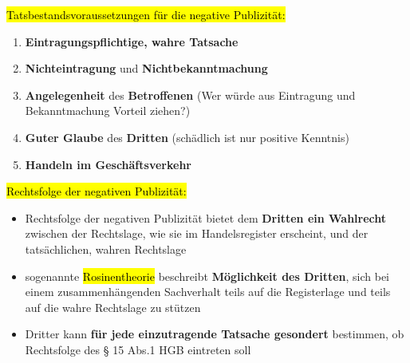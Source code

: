\documentclass[a4paper, 10pt]{article}
\begin{document}
\noindent\hl{Tatsbestandsvoraussetzungen für die negative Publizität:}
\begin{enumerate}
    \item \textbf{Eintragungspflichtige, wahre Tatsache}
    \item \textbf{Nichteintragung} und \textbf{Nichtbekanntmachung}
    \item \textbf{Angelegenheit} des \textbf{Betroffenen} (Wer würde aus Eintragung und Bekanntmachung Vorteil ziehen?)
    \item \textbf{Guter Glaube} des \textbf{Dritten} (schädlich ist nur positive Kenntnis)
    \item \textbf{Handeln im Geschäftsverkehr}
\end{enumerate}

\noindent\hl{Rechtsfolge der negativen Publizität:}
\begin{itemize}
    \item Rechtsfolge der negativen Publizität bietet dem \textbf{Dritten ein Wahlrecht} zwischen der Rechtslage, wie sie im Handelsregister erscheint, und der tatsächlichen, wahren Rechtslage 
    \item sogenannte \hl{Rosinentheorie} beschreibt \textbf{Möglichkeit des Dritten}, sich bei einem zusammenhängenden Sachverhalt teils auf die Registerlage und teils auf die wahre Rechtslage zu stützen
    \item Dritter kann \textbf{für jede einzutragende Tatsache gesondert} bestimmen, ob Rechtsfolge des § 15 Abs.1 HGB eintreten soll 
\end{itemize}
\end{document}
